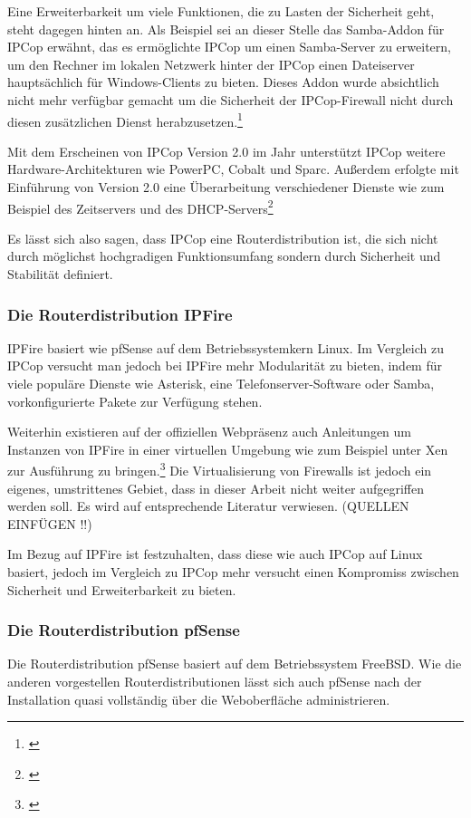 \documentclass[a4paper,12pt]{scrartcl}
\begin{document}
Eine Erweiterbarkeit um viele Funktionen, die zu Lasten der Sicherheit geht,
steht dagegen hinten an. Als Beispiel sei an dieser Stelle das Samba-Addon f\"ur
IPCop erw\"ahnt, das es erm\"oglichte IPCop um einen Samba-Server zu erweitern,
um den Rechner im lokalen Netzwerk hinter der IPCop einen Dateiserver
haupts\"achlich f\"ur Windows-Clients zu bieten. Dieses Addon wurde absichtlich
nicht mehr verf\"ugbar gemacht um die Sicherheit der IPCop-Firewall nicht durch
diesen zus\"atzlichen Dienst herabzusetzen.\footnote{\cite{IPCopSamba}}

Mit dem Erscheinen von IPCop Version 2.0 im Jahr unterst\"utzt IPCop weitere
Hardware-Architekturen wie PowerPC, Cobalt und
Sparc. Au\ss{}erdem erfolgte mit Einf\"uhrung
von Version 2.0 eine \"Uberarbeitung
verschiedener Dienste wie zum Beispiel des
Zeitservers und des DHCP-Servers\footnote{\cite{IPCop20Hardware}}

Es l\"asst sich also sagen, dass IPCop eine Routerdistribution ist, die sich
nicht durch m\"oglichst hochgradigen Funktionsumfang sondern durch Sicherheit
und Stabilit\"at definiert. 

\subsubsection{Die Routerdistribution IPFire}
IPFire basiert wie pfSense auf dem Betriebssystemkern Linux. Im Vergleich zu
IPCop versucht man jedoch bei IPFire mehr Modularit\"at zu bieten, indem f\"ur
viele popul\"are Dienste wie Asterisk, eine Telefonserver-Software oder Samba,
vorkonfigurierte Pakete zur Verf\"ugung stehen.

Weiterhin existieren auf der offiziellen Webpr\"asenz auch Anleitungen um
Instanzen von IPFire in einer virtuellen Umgebung wie zum Beispiel unter Xen
zur Ausf\"uhrung zu bringen.\footnote{\cite{IPFireAddons}} Die Virtualisierung
von Firewalls ist jedoch ein eigenes, umstrittenes Gebiet, dass in dieser
Arbeit nicht weiter aufgegriffen werden soll. Es wird auf entsprechende
Literatur verwiesen. (QUELLEN EINF\"UGEN !!)

Im Bezug auf IPFire ist festzuhalten, dass diese wie auch IPCop auf Linux
basiert, jedoch im Vergleich zu IPCop mehr versucht einen Kompromiss zwischen
Sicherheit und Erweiterbarkeit zu bieten.

\subsubsection{Die Routerdistribution pfSense}
Die Routerdistribution pfSense basiert auf dem Betriebssystem FreeBSD. Wie die
anderen vorgestellen Routerdistributionen l\"asst sich auch pfSense nach der
Installation quasi vollst\"andig \"uber die Weboberfl\"ache administrieren.
\end{document}
